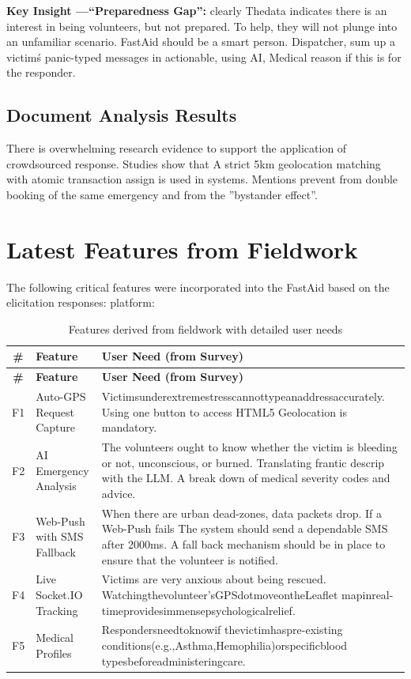 \documentclass[12pt,a4paper]{article}
\begin{document}
\textbf{Key Insight —“Preparedness Gap”:} clearly Thedata indicates there is an interest in being volunteers, but not prepared. To help, they will not plunge into an unfamiliar scenario. FastAid should be a smart person. Dispatcher, sum up a victim\'s panic-typed messages in actionable, using AI, Medical reason if this is for the responder.

\subsection{Document Analysis Results}
There is overwhelming research evidence to support the application of crowdsourced response. Studies show that A strict 5km geolocation matching with atomic transaction assign is used in systems. Mentions prevent from double booking of the same emergency and from the ”bystander effect”.

\section{Latest Features from Fieldwork}

The following critical features were incorporated into the FastAid based on the elicitation responses: platform:

\begin{longtable}{|c|p{4.5cm}|p{9.5cm}|}
\caption{Features derived from fieldwork with detailed user needs} \\
\hline
\rowcolor{lightorange}
\textbf{\#} & \textbf{Feature} & \textbf{User Need (from Survey)} \\
\hline
\endfirsthead
\hline
\rowcolor{lightorange}
\textbf{\#} & \textbf{Feature} & \textbf{User Need (from Survey)} \\
\hline
\endhead

F1 & Auto-GPS Request Capture & Victimsunderextremestresscannottypeanaddressaccurately. Using one button to access HTML5 Geolocation is mandatory. \\
\hline
F2 & AI Emergency Analysis & The volunteers ought to know whether the victim is bleeding or not, unconscious, or burned. Translating frantic descrip with the LLM. A break down of medical severity codes and advice. \\
\hline
F3 & Web-Push with SMS Fallback & When there are urban dead-zones, data packets drop. If a Web-Push fails The system should send a dependable SMS after 2000ms. A fall back mechanism should be in place to ensure that the volunteer is notified. \\
\hline
F4 & Live Socket.IO Tracking & Victims are very anxious about being rescued. Watchingthevolunteer’sGPSdotmoveontheLeaflet mapinreal-timeprovidesimmensepsychologicalrelief. \\
\hline
F5 & Medical Profiles & Respondersneedtoknowif thevictimhaspre-existing conditions(e.g.,Asthma,Hemophilia)orspecificblood typesbeforeadministeringcare. \\
\hline
\end{longtable}
\end{document}

